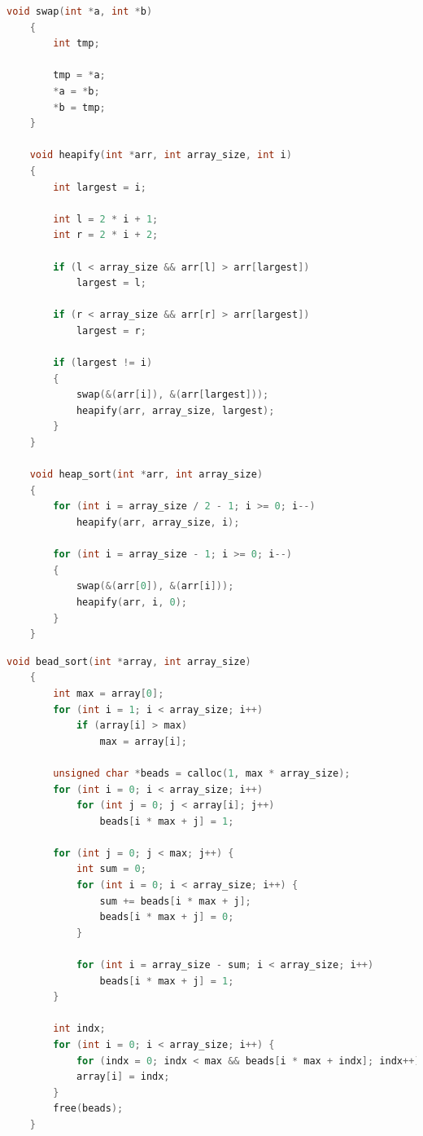 \documentclass[a4paper,14pt, unknownkeysallowed]{extreport}
\begin{document}
\clearpage

\begin{lstlisting}[label=heap,caption=Алгоритм пирамидальной сортировки,language=C]
    void swap(int *a, int *b)
    {
        int tmp;
            
        tmp = *a;
        *a = *b;
        *b = tmp;
    }

    void heapify(int *arr, int array_size, int i)
    {
        int largest = i;   
    
        int l = 2 * i + 1;
        int r = 2 * i + 2;
    
        if (l < array_size && arr[l] > arr[largest])
            largest = l;
    
        if (r < array_size && arr[r] > arr[largest])
            largest = r;
    
        if (largest != i)
        {
            swap(&(arr[i]), &(arr[largest]));
            heapify(arr, array_size, largest);
        }
    }

    void heap_sort(int *arr, int array_size)
    {
        for (int i = array_size / 2 - 1; i >= 0; i--)
            heapify(arr, array_size, i);
    
        for (int i = array_size - 1; i >= 0; i--)
        {
            swap(&(arr[0]), &(arr[i]));
            heapify(arr, i, 0);
        }
    }

\end{lstlisting}

\clearpage

\begin{lstlisting}[label=bead,caption=Алгоритм бисерной сортировки,language=C]
    void bead_sort(int *array, int array_size)
    {
        int max = array[0];
        for (int i = 1; i < array_size; i++)
            if (array[i] > max) 
                max = array[i];
        
        unsigned char *beads = calloc(1, max * array_size);
        for (int i = 0; i < array_size; i++)
            for (int j = 0; j < array[i]; j++)
                beads[i * max + j] = 1;
        
        for (int j = 0; j < max; j++) {
            int sum = 0;
            for (int i = 0; i < array_size; i++) {
                sum += beads[i * max + j];
                beads[i * max + j] = 0;
            }
    		
            for (int i = array_size - sum; i < array_size; i++) 
                beads[i * max + j] = 1;
        }
    	
        int indx;
        for (int i = 0; i < array_size; i++) {
            for (indx = 0; indx < max && beads[i * max + indx]; indx++);
            array[i] = indx;
        }
        free(beads);
    }
\end{lstlisting}
\end{document}
